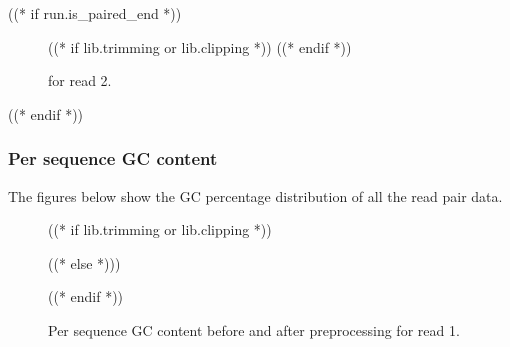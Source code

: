 ((* if run.is_paired_end *))
    \begin{figure}[h!]
        \centering
        \begin{minipage}[b]{0.48\textwidth}
            \centering
        \end{minipage}
        \begin{minipage}[b]{0.48\textwidth}
            \centering
            ((* if lib.trimming or lib.clipping *))
            ((* endif *))
        \end{minipage}
        \caption{\capBaseC for read 2.}
    \end{figure}
((* endif *))


\subsubsection{Per sequence GC content}
\newcommand{\capGCC}{Per sequence GC content before and after preprocessing }
    The figures below show the GC percentage distribution of all the read pair
    data.
    \begin{figure}[h!]
        \centering
        ((* if lib.trimming or lib.clipping *))
        \begin{minipage}[b]{0.48\textwidth}
            \centering
        \end{minipage}
        \begin{minipage}[b]{0.48\textwidth}
            \centering
        \end{minipage}
        ((* else *)))
        \begin{minipage}[b]{0.48\textwidth}
            \centering
        \end{minipage}
        ((* endif *))
        \caption{\capGCC for read 1.}
    \end{figure}

